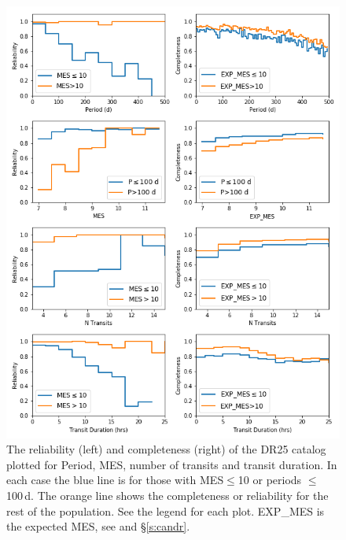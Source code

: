 \begin{figure}[ht]
 \begin{center}
  \includegraphics[width=0.93\linewidth]{fig-compRel1D-PerMes.png}
  \caption{ The reliability (left) and completeness (right)  of the DR25 catalog plotted for Period, MES, number of transits and transit duration. In each case the blue line is for those with MES$\leq$10 or periods $\leq$ 100\,d. The orange line shows the completeness or reliability for the rest of the population. See the legend for each plot. EXP\_MES is the expected MES, see \citet{Christiansen2017} and \S\ref{s:candr}.}
  \label{f:1dcompare}
 \end{center}
 \end{figure}

